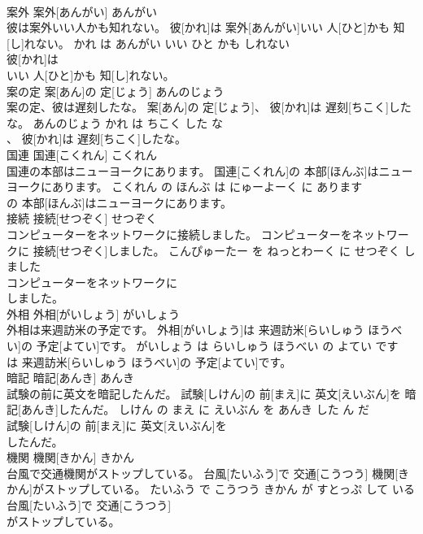 \documentclass[8pt]{extreport}
\begin{document}
\begin{CJK}{UTF8}{min}
\\	案外	案外[あんがい]	あんがい	
\\	彼は案外いい人かも知れない。	彼[かれ]は 案外[あんがい]いい 人[ひと]かも 知[し]れない。	かれ は あんがい いい ひと かも しれない	
\\	彼[かれ]は
\\	いい 人[ひと]かも 知[し]れない。			
\\	案の定	案[あん]の 定[じょう]	あんのじょう	
\\	案の定、彼は遅刻したな。	案[あん]の 定[じょう]、 彼[かれ]は 遅刻[ちこく]したな。	あんのじょう かれ は ちこく した な	
\\	、 彼[かれ]は 遅刻[ちこく]したな。			
\\	国連	国連[こくれん]	こくれん	
\\	国連の本部はニューヨークにあります。	国連[こくれん]の 本部[ほんぶ]はニューヨークにあります。	こくれん の ほんぶ は にゅーよーく に あります	
\\	の 本部[ほんぶ]はニューヨークにあります。			
\\	接続	接続[せつぞく]	せつぞく	
\\	コンピューターをネットワークに接続しました。	コンピューターをネットワークに 接続[せつぞく]しました。	こんぴゅーたー を ねっとわーく に せつぞく しました	
\\	コンピューターをネットワークに
\\	しました。			
\\	外相	外相[がいしょう]	がいしょう	
\\	外相は来週訪米の予定です。	外相[がいしょう]は 来週訪米[らいしゅう ほうべい]の 予定[よてい]です。	がいしょう は らいしゅう ほうべい の よてい です	
\\	は 来週訪米[らいしゅう ほうべい]の 予定[よてい]です。			
\\	暗記	暗記[あんき]	あんき	
\\	試験の前に英文を暗記したんだ。	試験[しけん]の 前[まえ]に 英文[えいぶん]を 暗記[あんき]したんだ。	しけん の まえ に えいぶん を あんき した ん だ	
\\	試験[しけん]の 前[まえ]に 英文[えいぶん]を
\\	したんだ。			
\\	機関	機関[きかん]	きかん	
\\	台風で交通機関がストップしている。	台風[たいふう]で 交通[こうつう] 機関[きかん]がストップしている。	たいふう で こうつう きかん が すとっぷ して いる	
\\	台風[たいふう]で 交通[こうつう]
\\	がストップしている。			

\end{CJK}
\end{document}
